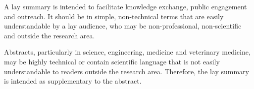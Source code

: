 \thispagestyle{plain}

A lay summary is intended to facilitate knowledge exchange, public engagement and outreach. It should be in simple, non-technical terms that are easily understandable by a lay audience, who may be non-professional, non-scientific and outside the research area.

Abstracts, particularly in science, engineering, medicine and veterinary medicine, may be highly technical or contain scientific language that is not easily understandable to readers outside the research area. Therefore, the lay summary is intended as supplementary to the abstract.